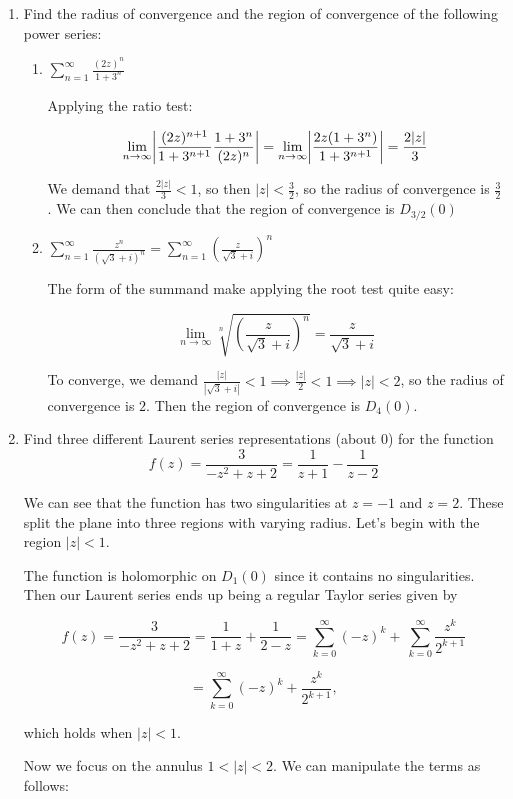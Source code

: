 \documentclass{article}
\DeclarePairedDelimiter\abs{\lvert}{\rvert}
\begin{document}
\begin{enumerate}
	\item Find the radius of convergence and the region of convergence of the following power series:
	\begin{enumerate}
		\item $\sum_{n=1}^{\infty}\frac{(2z)^n}{1+3^n}$
		
		Applying the ratio test:
		
		\[\lim_{n \to\infty}\abs*{\frac{(2z)^{n+1}}{1+3^{n+1}} \frac{1+3^n}{(2z)^n}} =\lim_{n \to\infty}\abs*{\frac{2z(1+3^n)}{1+3^{n+1}}}=\frac{2|z|}{3} \]
		
		We demand that $\frac{2|z|}{3}<1$, so then $|z|<\frac{3}{2}$, so the radius of convergence is $\frac{3}{2}$. We can then conclude that the region of convergence is $D_{3/2}(0)$
		
		\item $\sum_{n=1}^{\infty}\frac{z^n}{(\sqrt{3}+i)^n} = \sum_{n=1}^{\infty}(\frac{z}{\sqrt{3}+i})^n$
		
		The form of the summand make applying the root test quite easy:
		
		\[\lim_{n \to\infty}\sqrt[n]{\left(\frac{z}{\sqrt{3}+i}\right)^n} =\frac{z}{\sqrt{3}+i}\]
		
		To converge, we demand $\frac{|z|}{|\sqrt{3}+i|}<1 \implies \frac{|z|}{2}<1\implies |z|<2$, so the radius of convergence is $2$. Then the region of convergence is $D_4(0)$.
	\end{enumerate}
	
	\item Find three different Laurent series representations (about 0) for the function 
	\[f(z)=\frac{3}{-z^2+z+2}=\frac{1}{z+1}-\frac{1}{z-2} \]
	
	We can see that the function has two singularities at $z=-1$ and $z=2$. These split the plane into three regions with varying radius. Let's begin with the region $|z|<1$.
	
	The function is holomorphic on $D_1(0)$ since it contains no singularities. Then our Laurent series ends up being a regular Taylor series given by 
	
	\[ f(z)=\frac{3}{-z^2+z+2}=\frac{1}{1+z}+\frac{1}{2-z}=\sum_{k=0}^{\infty}(-z)^k+\ \sum_{k=0}^{\infty}\frac{z^k}{2^{k+1}} \]
	
	\[=\sum_{k=0}^{\infty}(-z)^k+\frac{z^k}{2^{k+1}}, \]
	
	which holds when $|z|<1$.
	
	Now we focus on the annulus $1<|z|<2$. We can manipulate the terms as follows:
	

\end{enumerate}
\end{document}
